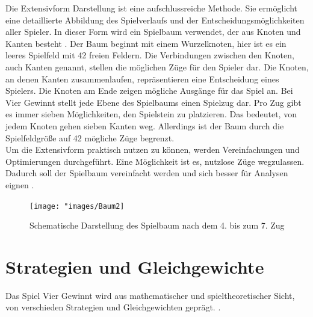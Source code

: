 Die Extensivform Darstellung ist eine aufschlussreiche Methode.
Sie ermöglicht eine detaillierte Abbildung des Spielverlaufs und der Entscheidungsmöglichkeiten aller Spieler.
In dieser Form wird ein Spielbaum verwendet, der aus Knoten und Kanten besteht \autocite{einsiedler2014spieltheorie}. 
Der Baum beginnt mit einem Wurzelknoten, hier ist es ein leeres Spielfeld mit 42 freien Feldern. Die Verbindungen zwischen den Knoten, auch Kanten genannt, stellen die möglichen Züge für den Spieler dar. Die Knoten, an denen Kanten zusammenlaufen, repräsentieren eine Entscheidung eines Spielers. Die Knoten am Ende zeigen mögliche Ausgänge für das Spiel an.
Bei Vier Gewinnt stellt jede Ebene des Spielbaums einen Spielzug dar. Pro Zug gibt es immer sieben Möglichkeiten, den Spielstein zu platzieren. Das bedeutet, von jedem Knoten gehen sieben Kanten weg. Allerdings ist der Baum durch die Spielfeldgröße auf 42 mögliche Züge begrenzt.\\
Um die Extensivform praktisch nutzen zu können, werden Vereinfachungen und Optimierungen durchgeführt. Eine Möglichkeit ist es, nutzlose Züge wegzulassen. Dadurch soll der Spielbaum vereinfacht werden und sich besser für Analysen eignen \autocite{ruile2009viergewinnt}.  
\begin{figure}[H]
	\centering
	\texttt{[image: "images/Baum2]}
	\caption[Spielbaum nach dem 4. Zug. Quelle: \cite{vandewiele2017}]{Schematische Darstellung des Spielbaum nach dem 4. bis zum 7. Zug}
	\label{fig:Baum2}
\end{figure}

\section{Strategien und Gleichgewichte}
Das Spiel Vier Gewinnt wird aus mathematischer und spieltheoretischer Sicht, von verschieden Strategien und Gleichgewichten geprägt.
.
